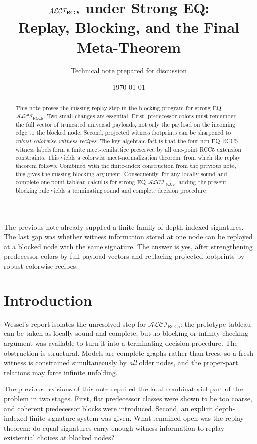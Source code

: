 \documentclass[11pt]{article}
\title{\texorpdfstring{$\ALCIRCCFive$}{ALCI RCC5} under Strong EQ:\\[0.35em]
Replay, Blocking, and the Final Meta-Theorem}
\author{Technical note prepared for discussion}
\date{\today}
\theoremstyle{definition}
\newcommand{\ALCIRCCFive}{\mathcal{ALCI}_{\mathsf{RCC5}}}
\begin{document}
\maketitle

\begin{abstract}
This note proves the missing replay step in the blocking program for strong-EQ $\ALCIRCCFive$. Two small changes are essential. First, predecessor colors must remember the full vector of truncated universal payloads, not only the payload on the incoming edge to the blocked node. Second, projected witness footprints can be sharpened to \emph{robust colorwise witness recipes}. The key algebraic fact is that the four non-EQ RCC5 witness labels form a finite meet-semilattice preserved by all one-point RCC5 extension constraints. This yields a colorwise meet-normalization theorem, from which the replay theorem follows. Combined with the finite-index construction from the previous note, this gives the missing blocking argument. Consequently, for any locally sound and complete one-point tableau calculus for strong-EQ $\ALCIRCCFive$, adding the present blocking rule yields a terminating sound and complete decision procedure.
\end{abstract}

\begin{tcolorbox}[colback=blue!3,colframe=blue!35!black,title=Main point]
The previous note already supplied a finite family of depth-indexed signatures. The last gap was whether witness information stored at one node can be replayed at a blocked node with the same signature. The answer is yes, after strengthening predecessor colors by full payload vectors and replacing projected footprints by robust colorwise recipes.
\end{tcolorbox}

\section{Introduction}

Wessel's report isolates the unresolved step for $\ALCIRCCFive$: the prototype tableau can be taken as locally sound and complete, but no blocking or infinity-checking argument was available to turn it into a terminating decision procedure. The obstruction is structural. Models are complete graphs rather than trees, so a fresh witness is constrained simultaneously by \emph{all} older nodes, and the proper-part relations may force infinite unfolding.

The previous revisions of this note repaired the local combinatorial part of the problem in two stages. First, flat predecessor classes were shown to be too coarse, and coherent predecessor blocks were introduced. Second, an explicit depth-indexed finite signature system was given. What remained open was the replay theorem: do equal signatures carry enough witness information to replay existential choices at blocked nodes?
\end{document}
